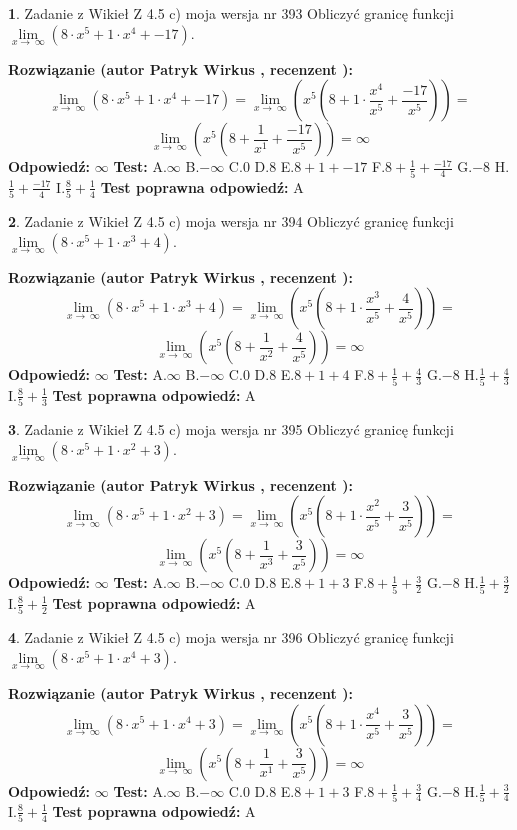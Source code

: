 \documentclass[12pt, a4paper]{article}
\theoremstyle{definition} %
\newtheorem{zad}{}
\newcommand{\zadStart}[1]{\begin{zad}#1\newline}
\newcommand{\zadStop}{\end{zad}}
\newcommand{\rozwStart}[2]{\noindent \textbf{Rozwiązanie (autor #1 , recenzent #2): }\newline}
\newcommand{\rozwStop}{\newline}
\newcommand{\odpStart}{\noindent \textbf{Odpowiedź:}\newline}
\newcommand{\odpStop}{\newline}
\newcommand{\testStart}{\noindent \textbf{Test:}\newline}
\newcommand{\testStop}{\newline}
\newcommand{\kluczStart}{\noindent \textbf{Test poprawna odpowiedź:}\newline}
\newcommand{\kluczStop}{\newline}
\begin{document}
\zadStart{Zadanie z Wikieł Z 4.5 c) moja wersja nr 393}
Obliczyć granicę funkcji  $\lim\limits_{x\to\ \infty}(8 \cdot x^{5}+1 \cdot x^{4}+-17)$.
\zadStop
\rozwStart{Patryk Wirkus}{}
$$\lim\limits_{x\to\ \infty}(8 \cdot x^{5}+1 \cdot x^{4}+-17) = \lim\limits_{x\to\ \infty}(x^{5}(8 +1 \cdot \frac{x^{4}}{x^{5}}+\frac{-17}{x^{5}})) =$$ $$\lim\limits_{x\to\ \infty}(x^{5}(8 +\frac{1}{x^{1}}+\frac{-17}{x^{5}})) =\infty$$
\rozwStop
\odpStart
$\infty$
\odpStop
\testStart
A.$\infty$ B.$-\infty$ C.$0$ D.$8$ E.$8 + 1 + -17$
F.$8+\frac{1}{5}+\frac{-17}{4}$ G.$-8$
H.$\frac{1}{5}+\frac{-17}{4}$
I.$\frac{8}{5}+\frac{1}{4}$
\testStop
\kluczStart
A
\kluczStop



\zadStart{Zadanie z Wikieł Z 4.5 c) moja wersja nr 394}
Obliczyć granicę funkcji  $\lim\limits_{x\to\ \infty}(8 \cdot x^{5}+1 \cdot x^{3}+4)$.
\zadStop
\rozwStart{Patryk Wirkus}{}
$$\lim\limits_{x\to\ \infty}(8 \cdot x^{5}+1 \cdot x^{3}+4) = \lim\limits_{x\to\ \infty}(x^{5}(8 +1 \cdot \frac{x^{3}}{x^{5}}+\frac{4}{x^{5}})) =$$ $$\lim\limits_{x\to\ \infty}(x^{5}(8 +\frac{1}{x^{2}}+\frac{4}{x^{5}})) =\infty$$
\rozwStop
\odpStart
$\infty$
\odpStop
\testStart
A.$\infty$ B.$-\infty$ C.$0$ D.$8$ E.$8 + 1 + 4$
F.$8+\frac{1}{5}+\frac{4}{3}$ G.$-8$
H.$\frac{1}{5}+\frac{4}{3}$
I.$\frac{8}{5}+\frac{1}{3}$
\testStop
\kluczStart
A
\kluczStop



\zadStart{Zadanie z Wikieł Z 4.5 c) moja wersja nr 395}
Obliczyć granicę funkcji  $\lim\limits_{x\to\ \infty}(8 \cdot x^{5}+1 \cdot x^{2}+3)$.
\zadStop
\rozwStart{Patryk Wirkus}{}
$$\lim\limits_{x\to\ \infty}(8 \cdot x^{5}+1 \cdot x^{2}+3) = \lim\limits_{x\to\ \infty}(x^{5}(8 +1 \cdot \frac{x^{2}}{x^{5}}+\frac{3}{x^{5}})) =$$ $$\lim\limits_{x\to\ \infty}(x^{5}(8 +\frac{1}{x^{3}}+\frac{3}{x^{5}})) =\infty$$
\rozwStop
\odpStart
$\infty$
\odpStop
\testStart
A.$\infty$ B.$-\infty$ C.$0$ D.$8$ E.$8 + 1 + 3$
F.$8+\frac{1}{5}+\frac{3}{2}$ G.$-8$
H.$\frac{1}{5}+\frac{3}{2}$
I.$\frac{8}{5}+\frac{1}{2}$
\testStop
\kluczStart
A
\kluczStop



\zadStart{Zadanie z Wikieł Z 4.5 c) moja wersja nr 396}
Obliczyć granicę funkcji  $\lim\limits_{x\to\ \infty}(8 \cdot x^{5}+1 \cdot x^{4}+3)$.
\zadStop
\rozwStart{Patryk Wirkus}{}
$$\lim\limits_{x\to\ \infty}(8 \cdot x^{5}+1 \cdot x^{4}+3) = \lim\limits_{x\to\ \infty}(x^{5}(8 +1 \cdot \frac{x^{4}}{x^{5}}+\frac{3}{x^{5}})) =$$ $$\lim\limits_{x\to\ \infty}(x^{5}(8 +\frac{1}{x^{1}}+\frac{3}{x^{5}})) =\infty$$
\rozwStop
\odpStart
$\infty$
\odpStop
\testStart
A.$\infty$ B.$-\infty$ C.$0$ D.$8$ E.$8 + 1 + 3$
F.$8+\frac{1}{5}+\frac{3}{4}$ G.$-8$
H.$\frac{1}{5}+\frac{3}{4}$
I.$\frac{8}{5}+\frac{1}{4}$
\testStop
\kluczStart
A
\kluczStop
\end{document}
